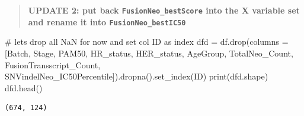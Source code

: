 \documentclass[
  letterpaper,
  DIV=11,
  numbers=noendperiod]{scrartcl}
\newenvironment{Shaded}{\begin{snugshade}}{\end{snugshade}}
\newcommand{\BuiltInTok}[1]{\textcolor[rgb]{0.00,0.23,0.31}{#1}}
\newcommand{\CommentTok}[1]{\textcolor[rgb]{0.37,0.37,0.37}{#1}}
\newcommand{\NormalTok}[1]{\textcolor[rgb]{0.00,0.23,0.31}{#1}}
\newcommand{\OperatorTok}[1]{\textcolor[rgb]{0.37,0.37,0.37}{#1}}
\newcommand{\StringTok}[1]{\textcolor[rgb]{0.13,0.47,0.30}{#1}}
\begin{document}
\begin{quote}
\textbf{UPDATE 2: put back \texttt{FusionNeo\_bestScore} into the X
variable set and rename it into \texttt{FusionNeo\_bestIC50}}
\end{quote}

\begin{Shaded}
\begin{Highlighting}[]
\CommentTok{\# let\textquotesingle{}s drop all NaN for now and set col \textquotesingle{}ID\textquotesingle{} as index}
\NormalTok{dfd }\OperatorTok{=}\NormalTok{ df.drop(columns }\OperatorTok{=}\NormalTok{ [}\StringTok{\textquotesingle{}Batch\textquotesingle{}}\NormalTok{, }\StringTok{\textquotesingle{}Stage\textquotesingle{}}\NormalTok{, }\StringTok{\textquotesingle{}PAM50\textquotesingle{}}\NormalTok{, }\StringTok{\textquotesingle{}HR\_status\textquotesingle{}}\NormalTok{, }\StringTok{\textquotesingle{}HER\_status\textquotesingle{}}\NormalTok{, }\StringTok{\textquotesingle{}AgeGroup\textquotesingle{}}\NormalTok{, }\StringTok{\textquotesingle{}TotalNeo\_Count\textquotesingle{}}\NormalTok{, }\StringTok{\textquotesingle{}FusionTransscript\_Count\textquotesingle{}}\NormalTok{, }\StringTok{\textquotesingle{}SNVindelNeo\_IC50Percentile\textquotesingle{}}\NormalTok{]).dropna().set\_index(}\StringTok{\textquotesingle{}ID\textquotesingle{}}\NormalTok{)}
\BuiltInTok{print}\NormalTok{(dfd.shape)}
\NormalTok{dfd.head()}
\end{Highlighting}
\end{Shaded}

\begin{verbatim}
(674, 124)
\end{verbatim}
\end{document}
